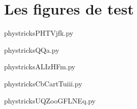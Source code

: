 \section{Les figures de test}



    \newcommand{\CaptionFigPHTVjfk}{This is an automatically generated default caption; do not change.}
    \begin{center}
        
    \end{center}
    phystricksPHTVjfk.py

    

    \clearpage
    


    \newcommand{\CaptionFigQQa}{This is an automatically generated default caption; do not change.}
    \begin{center}
        
    \end{center}
    phystricksQQa.py

    

    \clearpage
    


    \newcommand{\CaptionFigALIzHFm}{This is an automatically generated default caption; do not change.}
    \begin{center}
        
    \end{center}
    phystricksALIzHFm.py

    

    \clearpage
    


    \newcommand{\CaptionFigCbCartTuiii}{This is an automatically generated default caption; do not change.}
    \begin{center}
        
    \end{center}
    phystricksCbCartTuiii.py

    

    \clearpage
    


    \newcommand{\CaptionFigUQZooGFLNEq}{This is an automatically generated default caption; do not change.}
    \begin{center}
        
    \end{center}
    phystricksUQZooGFLNEq.py

